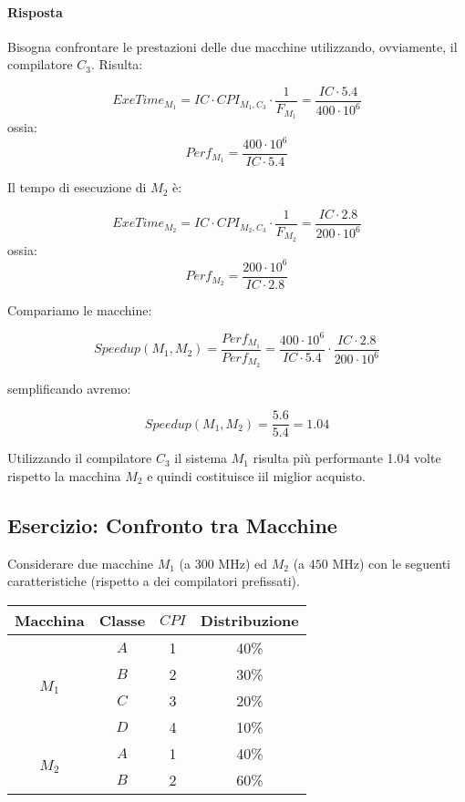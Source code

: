 \documentclass{article}
\begin{document}
    \paragraph{Risposta}
    Bisogna confrontare le prestazioni delle due macchine utilizzando, ovviamente, il compilatore $C_3$. Risulta:
    
    $$ExeTime_{M_1} = IC\cdot CPI_{M_1,C_3} \cdot  \frac{1}{F_{M_{1}}} = \frac{IC\cdot 5.4}{400\cdot 10^{6}}$$
    ossia:
    $$Perf_{M_{1}} = \frac{400\cdot 10^{6}}{IC\cdot 5.4} $$
    
    Il tempo di esecuzione di $M_2$ è:
    
    $$ExeTime_{M_2} = IC\cdot CPI_{M_2,C_3} \cdot  \frac{1}{F_{M_{2}}} = \frac{IC\cdot 2.8}{200\cdot 10^{6}}$$
    ossia:
    $$Perf_{M_{2}} = \frac{200\cdot 10^{6}}{IC\cdot 2.8} $$
    
    Compariamo le macchine:
    
    $$Speedup(M_1, M_2) = \frac{Perf_{M_1}}{Perf_{M_2}} = \frac{400\cdot 10^6}{IC\cdot 5.4} \cdot  \frac{IC\cdot 2.8}{200\cdot 10^6}$$
    
    semplificando avremo:
    
    $$Speedup(M_1, M_2) = \frac{5.6}{5.4} = 1.04$$
    
    Utilizzando il compilatore $C_3$ il sistema $M_1$ risulta più performante 1.04 volte rispetto la macchina $M_2$ e quindi costituisce iil miglior acquisto.
    
    \subsection{Esercizio: Confronto tra Macchine}
    Considerare due macchine $M_1$ (a $300$ MHz) ed $M_2$ (a $450$ MHz) con le seguenti caratteristiche (rispetto a dei compilatori prefissati).
    
    
\begin{table}[h!]
\begin{tabular}{|c|c|c|c|}
\hline
Macchina               & Classe & $CPI$ & Distribuzione \\ \hline
\multirow{4}{*}{$M_1$} & $A$      & 1     & 40\%          \\ \cline{2-4} 
                       & $B$      & 2     & 30\%          \\ \cline{2-4} 
                       & $C$      & 3     & 20\%          \\ \cline{2-4} 
                       & $D$      & 4     & 10\%          \\ \hline
\multirow{2}{*}{$M_2$} & $A$      & 1     & 40\%          \\ \cline{2-4} 
                       & $B$      & 2     & 60\%          \\ \hline
\end{tabular}
\end{table}
    
\end{document}
